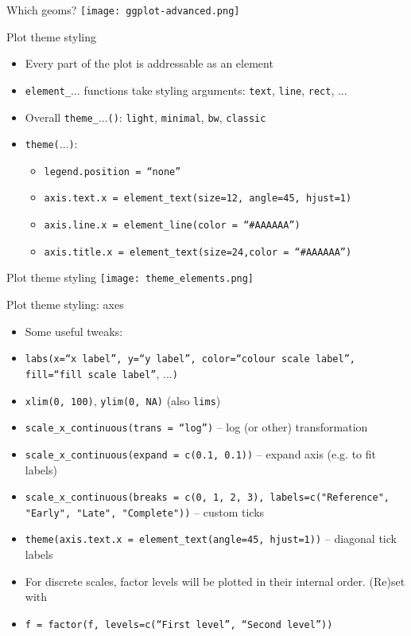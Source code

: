 \documentclass[10pt]{beamer}
\begin{document}
\begin{frame}{Which geoms?}
  \texttt{[image: ggplot-advanced.png]}
  \end{frame}

\begin{frame}{Plot theme styling}
    \begin{itemize}
    \item Every part of the plot is addressable as an element
      \item \texttt{element\_}... functions take styling arguments: \texttt{text}, \texttt{line}, \texttt{rect}, ...
    \item Overall \texttt{theme\_}...\texttt{()}: \texttt{light}, \texttt{minimal}, \texttt{bw}, \texttt{classic}
    \item \texttt{theme(}...\texttt{)}:
      \begin{itemize}
      \item \texttt{legend.position = ``none''}
      \item \texttt{axis.text.x = element\_text(size=12, angle=45, hjust=1)}
      \item \texttt{axis.line.x = element\_line(color = ``\#AAAAAA'')}
        \item \texttt{axis.title.x = element\_text(size=24,color = ``\#AAAAAA'')}
      \end{itemize}
      \end{itemize}
\end{frame}

\begin{frame}{Plot theme styling}
  \texttt{[image: theme\_elements.png]} \\
  \end{frame}

\begin{frame}{Plot theme styling: axes}
    \begin{itemize}
    \item Some useful tweaks:
    \item \texttt{labs(x=``x label'', y=``y label'', color=``colour scale label'', fill=``fill scale label''}, ...\texttt{)}
    \item \texttt{xlim(0, 100)}, \texttt{ylim(0, NA)} (also \texttt{lims})
    \item \texttt{scale\_x\_continuous(trans = ``log'')} -- log (or other) transformation
    \item \texttt{scale\_x\_continuous(expand = c(0.1, 0.1))} -- expand axis (e.g. to fit labels)
           \item \texttt{scale\_x\_continuous(breaks = c(0, 1, 2, 3), labels=c("Reference", "Early", "Late", "Complete"))} -- custom ticks
           \item \texttt{theme(axis.text.x = element\_text(angle=45, hjust=1))} -- diagonal tick labels
           \item For discrete scales, factor levels will be plotted in their internal order. (Re)set with
             \item[] \texttt{f = factor(f, levels=c(``First level'', ``Second level''))}
      \end{itemize}
\end{frame}
\end{document}
